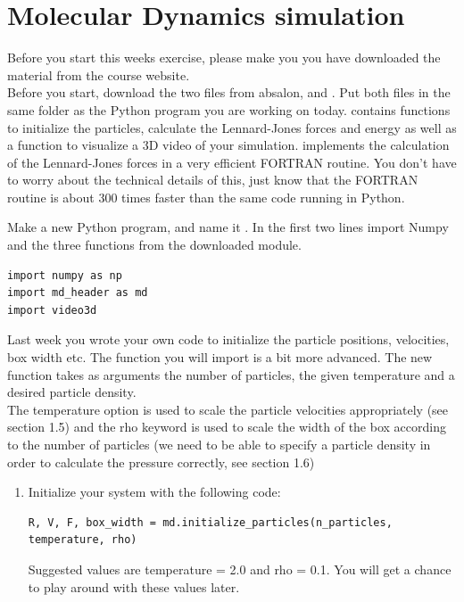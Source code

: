 \documentclass{article}
\begin{document}
\newpage

\section{Molecular Dynamics simulation}

Before you start this weeks exercise, please make you you have downloaded the
material from the course website.\\

Before you start, download the two files from absalon,  and
. Put both files in the same folder as the Python program you are
working on today.  contains functions to initialize the particles,
calculate the Lennard-Jones forces and energy as well as a function to
visualize a 3D video of your simulation.  implements the
calculation of the Lennard-Jones forces in a very efficient FORTRAN routine. You
don't have to worry about the technical details of this, just know that the
FORTRAN routine is about 300 times faster than the same code running in Python.

Make a new Python program, and name it .
In the first two lines import Numpy and the three functions from the downloaded
module.

\begin{lstlisting}
import numpy as np
import md_header as md
import video3d
\end{lstlisting}

Last week you wrote your own code to initialize the particle positions,
velocities, box width etc. The  function you
will import is a bit more advanced.
The new  function takes as arguments the number of
particles, the given temperature and a desired particle density.\\

The temperature option is used to scale the particle velocities appropriately
(see section 1.5) and the rho keyword is used to scale the width of the box
according to the number of particles (we need to be able to specify a particle
density in order to calculate the pressure correctly, see section 1.6)

\begin{enumerate}

    \item Initialize your system with the following code:

\begin{lstlisting}
R, V, F, box_width = md.initialize_particles(n_particles, temperature, rho)
\end{lstlisting}

        Suggested values are temperature = 2.0 and rho = 0.1.
        You will get a chance to play around with these values later.

\end{enumerate}
\end{document}
